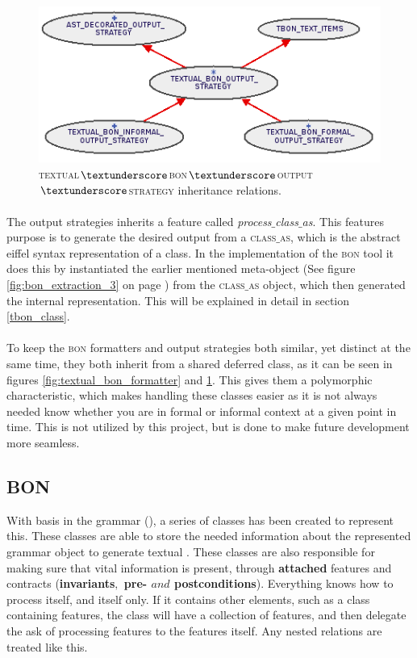 \begin{figure}[h]
\centerline{
\includegraphics[scale=0.7]{images/bon-extraction-output-strategy.png}
}
\caption{\textsc{textual$\textunderscore$bon$\textunderscore$output$\textunderscore$strategy} inheritance relations.}
\label{fig:bon-extraction-output-strategy}
\end{figure}

\paragraph{}
The output strategies inherits a feature called \textit{process$\_$class$\_$as}. This features purpose is to generate the desired output from a \textsc{class$\_$as}, which is the abstract eiffel syntax representation of a class. In the implementation of the \textsc{bon} tool it does this by instantiated the earlier mentioned meta-object (See figure \ref{fig:bon_extraction_3} on page \pageref{fig:bon_extraction_3}) from the \textsc{class$\_$as} object, which then generated the internal representation. This will be explained in detail in section \ref{tbon_class}.

\paragraph{}
To keep the \textsc{bon} formatters and output strategies both similar, yet distinct at the same time, they both inherit from a shared deferred class, as it can be seen in figures \ref{fig:textual_bon_formatter} and \ref{fig:bon-extraction-output-strategy}. This gives them a polymorphic characteristic, which makes handling these classes easier as it is not always needed know whether you are in formal or informal context at a given point in time. This is not utilized by this project, but is done to make future development more seamless. 

\subsection{BON}
With basis in the \bon{} grammar (\cite{walden1995}), a series of classes has been created to represent this. These classes are able to store the needed information about the represented grammar object to generate textual \bon. These classes are also responsible for making sure that vital information is present, through \textbf{attached} features and contracts (\textbf{invariants$,$ pre- $and$ postconditions}). Everything knows how to process itself, and itself only. If it contains other elements, such as a class containing features, the class will have a collection of features, and then delegate the ask of processing features to the features itself. Any nested relations are treated like this.

